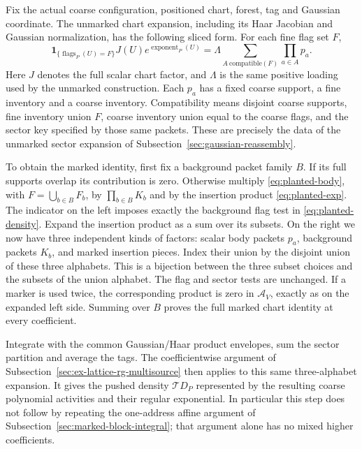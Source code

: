 Fix the actual coarse configuration, positioned chart, forest, tag and
Gaussian coordinate. The unmarked chart expansion, including its Haar
Jacobian and Gaussian normalization, has the following sliced form.
For each fine flag set $F$,
\begin{equation}\label{eq:planted-body}
 \mathbf1_{\{\operatorname{flags}_P(U)=F\}}
          J(U)e^{\operatorname{exponent}_P(U)}
   =\Lambda\sum_{A\ \text{compatible}(F)}\prod_{a\in A}p_a.
\end{equation}
Here $J$ denotes the full scalar chart factor, and $\Lambda$ is the
same positive loading used by the unmarked construction. Each $p_a$
has a fixed coarse support, a fine inventory and a coarse inventory.
Compatibility means disjoint coarse supports, fine inventory union $F$,
coarse inventory union equal to the coarse flags, and the sector key
specified by those same packets. These are precisely the data of the
unmarked sector expansion of Subsection~\ref{sec:gaussian-reassembly}.

To obtain the marked identity, first fix a background packet family
$B$. If its full supports overlap its contribution is zero. Otherwise
multiply \eqref{eq:planted-body}, with $F=\bigcup_{b\in B}F_b$, by
$\prod_{b\in B}K_b$ and by the insertion product
\eqref{eq:planted-exp}. The indicator on the left imposes exactly the
background flag test in \eqref{eq:planted-density}. Expand the insertion
product as a sum over its subsets. On the right we now have three
independent kinds of factors: scalar body packets $p_a$, background
packets $K_b$, and marked insertion pieces. Index their union by the
disjoint union of these three alphabets. This is a bijection between
the three subset choices and the subsets of the union alphabet.
The flag and sector tests are unchanged. If a marker is used twice,
the corresponding product is zero in $\mathscr A_V$, exactly as on
the expanded left side. Summing over $B$ proves the full marked
chart identity at every coefficient.

Integrate with the common Gaussian/Haar product envelopes, sum the
sector partition and average the tags. The coefficientwise argument of
Subsection~\ref{sec:ex-lattice-rg-multisource} then applies to this same
three-alphabet expansion. It gives the pushed density
$\mathcal T D_P$ represented by the resulting coarse polynomial
activities and their regular exponential. In particular this step does
not follow by repeating the one-address affine argument of
Subsection~\ref{sec:marked-block-integral}; that argument alone has no
mixed higher coefficients.

